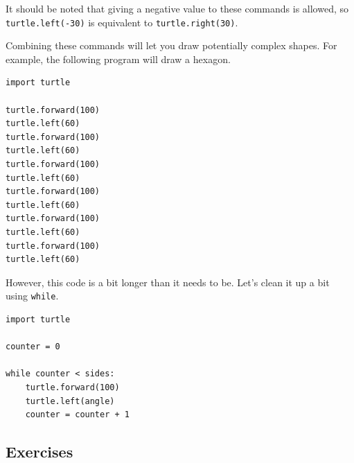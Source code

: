 \documentclass[11pt]{cselabheader}
\begin{document}
It should be noted that giving a negative value to these commands is allowed, so
\lstinline!turtle.left(-30)! is equivalent to \lstinline!turtle.right(30)!.

Combining these commands will let you draw potentially complex shapes. For
example, the following program will draw a hexagon.

\begin{lstlisting}[style=python]
import turtle

turtle.forward(100)
turtle.left(60)
turtle.forward(100)
turtle.left(60)
turtle.forward(100)
turtle.left(60)
turtle.forward(100)
turtle.left(60)
turtle.forward(100)
turtle.left(60)
turtle.forward(100)
turtle.left(60)
\end{lstlisting}

However, this code is a bit longer than it needs to be. Let's clean it up a bit using \lstinline{while}.

\begin{lstlisting}[style=python]
import turtle

counter = 0

while counter < sides:
    turtle.forward(100)
    turtle.left(angle)
    counter = counter + 1
\end{lstlisting}

\subsection{Exercises}
\label{subsec:turtleex}
\end{document}

